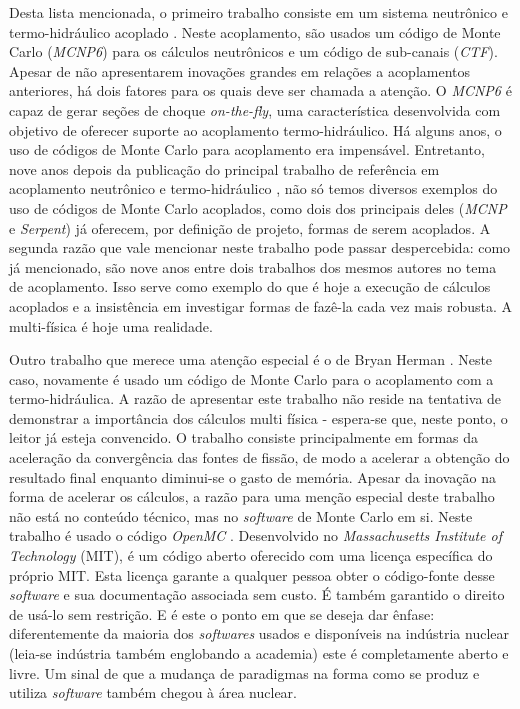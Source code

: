 Desta lista mencionada, o primeiro trabalho consiste em um sistema neutrônico e termo-hidráulico
acoplado \cite{Bennett2016}. Neste acoplamento, são usados um código
de Monte Carlo (\textit{MCNP6}) para os cálculos neutrônicos e um código de sub-canais (\textit{CTF}). Apesar de não apresentarem
inovações grandes em relações a acoplamentos anteriores, há dois fatores para os quais deve ser chamada a atenção.
O \textit{MCNP6} é capaz de gerar seções de choque \textit{on-the-fly}, uma característica desenvolvida com objetivo
de oferecer suporte ao acoplamento termo-hidráulico. Há alguns anos, o uso de códigos de Monte Carlo para
acoplamento era impensável. Entretanto, nove anos depois da publicação do principal trabalho
de referência em acoplamento neutrônico e termo-hidráulico \cite{Ivanov2007}, não só temos
diversos exemplos do uso de códigos de Monte Carlo acoplados, como dois dos principais deles (\textit{MCNP} e \textit{Serpent})
já oferecem, por definição de projeto, formas de serem acoplados. A segunda razão que vale mencionar neste
trabalho pode passar despercebida: como já mencionado, são nove anos entre dois trabalhos dos mesmos autores no tema de acoplamento.
Isso serve como exemplo do que é hoje a execução de cálculos acoplados e a insistência em
investigar formas de fazê-la cada vez mais robusta. A multi-física é hoje uma realidade.

Outro trabalho que merece uma atenção especial é o de Bryan Herman \cite{Herman2015}. Neste caso, novamente
é usado um código de Monte Carlo para o acoplamento com a termo-hidráulica. A razão de apresentar este trabalho
não reside na tentativa de demonstrar a importância dos cálculos multi física - espera-se que, neste ponto,
o leitor já esteja convencido. O trabalho consiste principalmente em formas da aceleração da
convergência das fontes de fissão, de modo a acelerar a obtenção do resultado final enquanto
diminui-se o gasto de memória. Apesar da inovação na forma de acelerar os cálculos, a razão para uma menção
especial deste trabalho não está no conteúdo técnico, mas no \textit{software} de Monte Carlo em si.
Neste trabalho é usado o código \textit{OpenMC} \cite{Romano2013}. Desenvolvido no \textit{Massachusetts
  Institute of Technology} (MIT), é um código aberto oferecido com uma licença específica do próprio MIT.
Esta licença garante a qualquer pessoa obter o código-fonte desse \textit{software} e sua
documentação associada sem custo. É também garantido o direito de usá-lo sem restrição.
E é este o ponto em que se deseja dar ênfase: diferentemente da maioria
dos \textit{softwares} usados e disponíveis na indústria nuclear (leia-se indústria também englobando a academia)
este é completamente aberto e livre. Um sinal de que a mudança de paradigmas na
forma como se produz e utiliza \textit{software} também chegou à área nuclear.

